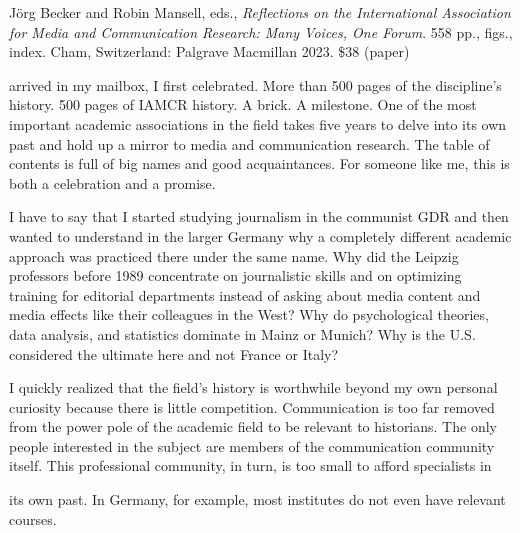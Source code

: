 \documentclass{tufte-handout}
\begin{document}
\begin{titlepage}
\vspace*{1em}


\noindent Jörg Becker and Robin Mansell, eds., \emph{Reflections on the International Association for
Media and Communication Research: Many Voices, One
Forum}. 558 pp., figs., index. Cham, Switzerland:
Palgrave Macmillan 2023. \$38 (paper)

 arrived in my mailbox, I first celebrated. More than 500
pages of the discipline's history. 500 pages of IAMCR history. A brick.
A milestone. One of the most important academic associations in the
field takes five years to delve into its own past and hold up a mirror
to media and communication research. The table of contents is full of
big names and good acquaintances. For someone like me, this is both a
celebration and a promise.

I have to say that I started studying journalism in the communist GDR
and then wanted to understand in the larger Germany why a completely
different academic approach was practiced there under the same name. Why
did the Leipzig professors before 1989 concentrate on journalistic
skills and on optimizing training for editorial departments instead of
asking about media content and media effects like their colleagues in
the West? Why do psychological theories, data analysis, and statistics
dominate in Mainz or Munich? Why is the U.S. considered the ultimate
here and not France or Italy?

I quickly realized that the field's history is worthwhile beyond my own
personal curiosity because there is little competition. Communication is
too far removed from the power pole of the academic field to be relevant
to historians. The only people interested in the subject are members of
the communication community itself. This professional community, in
turn, is too small to afford specialists in

\enlargethispage{2\baselineskip}

\vspace*{2em}



 \end{titlepage}




\noindent its own past. In Germany,
for example, most institutes do not even have relevant courses.
\end{document}
